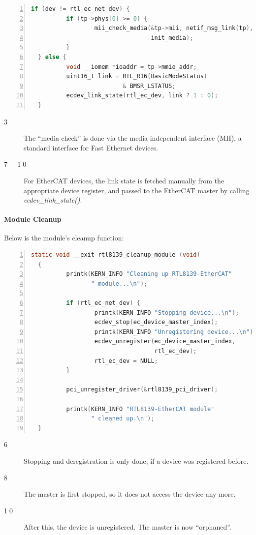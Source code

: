 \documentclass[a4paper,12pt,BCOR6mm,bibtotoc,idxtotoc]{scrbook}
\newcommand{\linenum}[1]{\normalfont\textcircled{\tiny #1}}
\begin{document}
\begin{lstlisting}[gobble=2,language=C,numbers=left]
  if (dev != rtl_ec_net_dev) {
          if (tp->phys[0] >= 0) {
                  mii_check_media(&tp->mii, netif_msg_link(tp),
                                  init_media);
          }
  } else {
          void __iomem *ioaddr = tp->mmio_addr;
          uint16_t link = RTL_R16(BasicModeStatus)
                          & BMSR_LSTATUS;
          ecdev_link_state(rtl_ec_dev, link ? 1 : 0);
  }
\end{lstlisting}

\begin{description}
\item[\linenum{3}] The ``media check'' is done
  via the media independent interface (MII), a standard interface for Fast Ethernet
  devices.
\item[\linenum{7} -- \linenum{10}] For
  EtherCAT devices, the link state is fetched manually from the
  appropriate device register, and passed to the EtherCAT master by
  calling \textit{ecdev\_\-link\_\-state()}.
\end{description}

\paragraph{Module Cleanup}

Below is the module's cleanup function:

\begin{lstlisting}[gobble=2,language=C,numbers=left]
  static void __exit rtl8139_cleanup_module (void)
  {
          printk(KERN_INFO "Cleaning up RTL8139-EtherCAT"
                 " module...\n");

          if (rtl_ec_net_dev) {
                  printk(KERN_INFO "Stopping device...\n");
                  ecdev_stop(ec_device_master_index);
                  printk(KERN_INFO "Unregistering device...\n");
                  ecdev_unregister(ec_device_master_index,
                                   rtl_ec_dev);
                  rtl_ec_dev = NULL;
          }

          pci_unregister_driver(&rtl8139_pci_driver);

          printk(KERN_INFO "RTL8139-EtherCAT module"
                 " cleaned up.\n");
  }
\end{lstlisting}

\begin{description}

\item[\linenum{6}] Stopping and deregistration is only done, if a device was
registered before.

\item[\linenum{8}] The master is first stopped, so it does not access the
device any more.

\item[\linenum{10}] After this, the device is unregistered. The master is now
``orphaned''.

\end{description}
\end{document}
